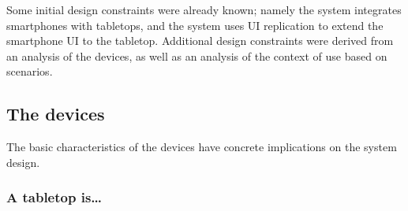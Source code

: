 Some initial design constraints were already known; namely the system integrates smartphones with tabletops, and the system uses UI replication to extend the smartphone UI to the tabletop.
Additional design constraints were derived from an analysis of the devices, as well as an analysis of the context of use based on scenarios.



\subsection{The devices}

The basic characteristics of the devices have concrete implications on the system design.

\subsubsection{A tabletop is\ldots}

